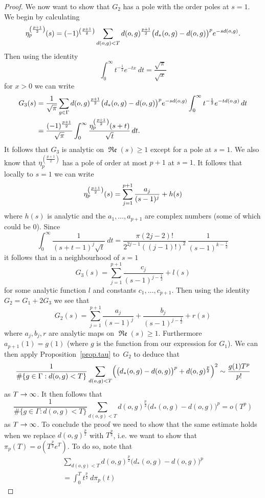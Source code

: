 \documentclass[AHL,Unicode,longabstracts,published]{cedram}
\newcommand{\G}{\Gamma}
\DeclareMathOperator{\fkRe}{\mathfrak{Re}}
\let\originalleft\left
\let\originalright\right
\renewcommand{\left}{\mathopen{}\mathclose\bgroup\originalleft}
\renewcommand{\right}{\aftergroup\egroup\originalright}
\renewcommand*{\to}{\mathchoice{\longrightarrow}{\rightarrow}{\rightarrow}{\rightarrow}}
\theoremstyle{plain}
\newcommand{\G}{\Gamma}
\begin{document}
\begin{proof}
We now want to show that $G_2$ has a pole with the order poles at $s=1$. We begin by calculating
\[
\eta_p^{\left(\frac{p+1}{2}\right)}(s) = (-1)^{\left(\frac{p+1}{2}\right)} \sum_{d(o,g) <T} d(o,g)^{ \frac{p+1}{2}}\bigl(d_\ast(o,g) - d(o,g)\bigr)^p e^{-sd(o,g)}.
\]
Then using the identity
\[
\int_0^\infty t^{-\frac{1}{2}} e^{-tx} \ dt = \frac{\sqrt{\pi}}{\sqrt{x}}
\]
for $x >0$ we can write
\begin{align*}
G_3(s) &= \frac{1}{\sqrt{\pi}} \sum_{g\in\G} d(o,g)^{\frac{p+1}{2}} \bigl(d_\ast(o,g) - d(o,g)\bigr)^p e^{-sd(o,g)} \int_0^\infty t^{-\frac{1}{2}} e^{-td(o,g)} \, dt\\
&= \frac{(-1)^{\frac{p+1}{2}}}{\sqrt{\pi}} \int_0^\infty \frac{\eta_p^{\left(\frac{p+1}{2}\right)}(s+t) }{\sqrt{t}} \, dt.
\end{align*}
It follows that $G_3$ is analytic on $\fkRe(s) \ge 1$ except for a pole at $s=1$. We also know that $\eta_p^{(\frac{p+1}{2})}$ has a pole of order at most $p+1$ at $s=1$. It follows that locally to $s=1$ we can write
\[
\eta_p^{\left(\frac{p+1}{2}\right)}(s) = \sum_{j=1}^{p+1} \frac{a_j}{(s-1)^j} + h(s)
\]
where $h(s)$ is analytic and the $a_1,\dots, a_{p+1}$ are complex numbers (some of which could be $0$). Since
\[
\int_0^\infty \frac{1}{(s+t -1)^j \sqrt{t}} \ dt = \frac{\pi (2j-2)!}{2^{2j-1}((j-1)!)^2} \, \frac{1}{(s-1)^{k-\frac{1}{2}}}
\]
it follows that in a neighbourhood of $s=1$
\[
G_3(s) = \sum_{j=1}^{p+1} \frac{c_j}{(s-1)^{j-\frac{1}{2}}} + l(s)
\]
for some analytic function $l$ and constants $c_1, \dots, c_{p+1}$. Then using the identity $G_2 = G_1 + 2G_3$ we see that
\[
G_2(s) = \sum_{j=1}^{p+1} \frac{a_j}{(s-1)^j} + \frac{b_j}{(s-1)^{j-\frac{1}{2}}} + r(s)
\]
where $a_j, b_j,r$ are analytic maps on $\fkRe(s) \ge 1$. Furthermore $a_{p+1}(1) = g(1)$ (where $g$ is the function from our expression for $G_1$). We can then apply Proposition~\ref{prop.tau} to~$G_2$ to deduce that
\[
\frac{1}{\#\{g\in\G: d(o,g) <T\}} \sum_{d(o,g) < T} \left(\bigl(d_\ast(o,g) - d(o,g)\bigr)^p + d(o,g)^{\frac{p}{2}} \right)^2 \sim \frac{g(1)T^{p}}{p!}
\]
as $T \to\infty$. It then follows that
\[
\frac{1}{\#\{g\in\G:d(o,g) <T\}}\sum_{d(o,g) < T} d(o,g)^{\frac{p}{2}} \bigl(d_\ast(o,g) - d(o,g)\bigr)^p = o(T^p)
\]
as $T\to\infty$. To conclude the proof we need to show that the same estimate holds when we replace $d(o,g)^{\frac{p}{2}}$ with $T^{\frac{p}{2}}$, i.e. we want to show that $\pi_p(T) = o(T^{\frac{p}{2}} e^T)$. To do so, note that
\begin{multline}\label{eq.pi}
\sum_{d(o,g) < T} d(o,g)^{\frac{p}{2}} \bigl(d_\ast(o,g) - d(o,g)\bigr)^p \\= \int_0^T t^{\frac{p}{2}} \ d\pi_p(t)

\end{multline}
\end{proof}
\end{document}
